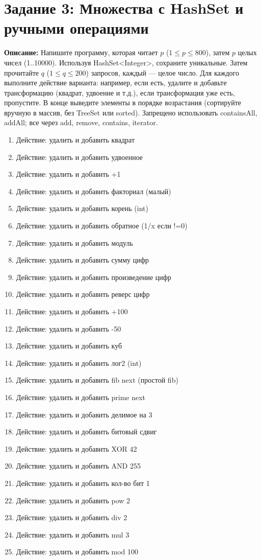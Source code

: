 \documentclass[12pt]{article}
\begin{document}
\section*{Задание 3: Множества с HashSet и ручными операциями}
  \textbf{Описание:} Напишите программу, которая читает $p$ ($1 \leq p \leq 800$), затем $p$ целых чисел (1..10000). Используя HashSet<Integer>, сохраните уникальные. Затем прочитайте $q$ ($1 \leq q \leq 200$) запросов, каждый — целое число. Для каждого выполните действие варианта: например, если есть, удалите и добавьте трансформацию (квадрат, удвоение и т.д.), если трансформация уже есть, пропустите. В конце выведите элементы в порядке возрастания (сортируйте вручную в массив, без TreeSet или sorted). Запрещено использовать containsAll, addAll; все через add, remove, contains, iterator.

  \begin{enumerate}
    \item Действие: удалить и добавить квадрат
    \item Действие: удалить и добавить удвоенное
    \item Действие: удалить и добавить +1
    \item Действие: удалить и добавить факториал (малый)
    \item Действие: удалить и добавить корень (int)
    \item Действие: удалить и добавить обратное (1/x если !=0)
    \item Действие: удалить и добавить модуль
    \item Действие: удалить и добавить сумму цифр
    \item Действие: удалить и добавить произведение цифр
    \item Действие: удалить и добавить реверс цифр
    \item Действие: удалить и добавить +100
    \item Действие: удалить и добавить -50
    \item Действие: удалить и добавить куб
    \item Действие: удалить и добавить лог2 (int)
    \item Действие: удалить и добавить fib next (простой fib)
    \item Действие: удалить и добавить prime next
    \item Действие: удалить и добавить делимое на 3
    \item Действие: удалить и добавить битовый сдвиг
    \item Действие: удалить и добавить XOR 42
    \item Действие: удалить и добавить AND 255
    \item Действие: удалить и добавить кол-во бит 1
    \item Действие: удалить и добавить pow 2
    \item Действие: удалить и добавить div 2
    \item Действие: удалить и добавить mul 3
    \item Действие: удалить и добавить mod 100
  \end{enumerate}
\end{document}
